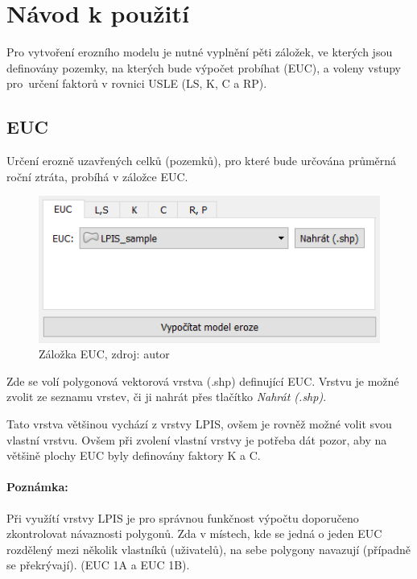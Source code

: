 \section{Návod k použití}
\label{navod_k_pouziti} Pro vytvoření erozního modelu je nutné
vyplnění pěti záložek, ve kterých jsou definovány pozemky, na kterých
bude výpočet probíhat (EUC), a voleny vstupy pro~určení faktorů v
rovnici USLE (LS, K, C a RP).
\subsection{EUC} Určení erozně uzavřených celků (pozemků), pro které
bude určována průměrná roční ztráta, probíhá v záložce EUC.

	\begin{figure}[H] \centering
		\includegraphics[width=.5\textwidth]{./pictures/euc.png}
		\caption[Záložka EUC]{Záložka EUC, zdroj: autor}
		\label{zalozka_euc}
 	\end{figure}

Zde se volí polygonová vektorová vrstva (.shp) definující EUC. Vrstvu
je možné zvolit ze seznamu vrstev, či ji nahrát přes tlačítko
\textit{Nahrát (.shp)}.

Tato vrstva většinou vychází z vrstvy LPIS, ovšem je rovněž možné
volit svou vlastní vrstvu. Ovšem při zvolení vlastní vrstvy je potřeba
dát pozor, aby na většině plochy EUC byly definovány faktory K a C.

\paragraph{Poznámka:} Při využítí vrstvy LPIS je pro správnou
funkčnost výpočtu doporučeno zkontrolovat návaznosti polygonů. Zda v
místech, kde se jedná o jeden EUC rozdělený mezi několik vlastníků
(uživatelů), na sebe polygony navazují (případně se překrývají). (EUC
1A a EUC 1B).

